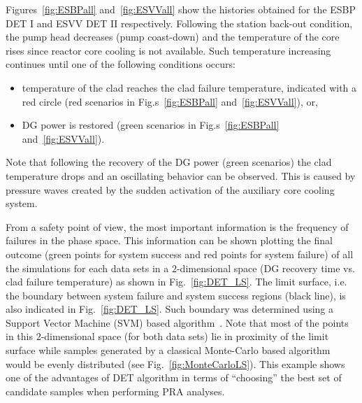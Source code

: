 \documentclass{mc2013}
\begin{document}
Figures~\ref{fig:ESBPall} and~\ref{fig:ESVVall} show the histories obtained for the ESBP DET I and ESVV DET II respectively.
Following the station back-out condition, the pump head decreases (pump coast-down) and the temperature of the core rises since reactor core cooling is not available. Such temperature increasing continues until one of the following conditions occurs:
\vspace{-5mm}
\begin{itemize}
\item temperature of the clad reaches the clad failure temperature, indicated with a red circle (red scenarios in Fig.s~\ref{fig:ESBPall} and~\ref{fig:ESVVall}), or,
\item DG power is restored (green scenarios in Fig.s~\ref{fig:ESBPall} and~\ref{fig:ESVVall}).
\end{itemize}
\vspace{-5mm}
Note that following the recovery of the DG power (green scenarios) the clad temperature drops  and an oscillating behavior can be observed.
This is caused by pressure waves created by the sudden activation of the auxiliary core cooling system.

From a safety point of view, the most important information is the frequency of failures in the phase space. This information can be shown plotting the final outcome (green points for system success and red points for system failure) of all the simulations for each data sets in a $2$-dimensional space (DG recovery time vs. clad failure temperature) as shown in Fig.~\ref{fig:DET_LS}.
The limit surface, i.e. the boundary between system failure and system success regions (black line), is also indicated in Fig.~\ref{fig:DET_LS}. Such boundary was determined using a Support Vector Machine (SVM) based algorithm~\cite{mandelliSVMANS}.
Note that most of the points in this $2$-dimensional space (for both data sets) lie in proximity  of the limit surface while samples generated by a classical Monte-Carlo based algorithm would be evenly distributed (see Fig.~\ref{fig:MonteCarloLS}). 
This example shows one of the advantages of DET algorithm in terms of ``choosing'' the best set of candidate samples when performing PRA analyses.

\end{document}
